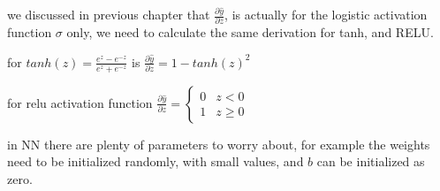 \documentclass[4apaper,12pt]{book}
\begin{document}
\begin{description}
\item we discussed in previous chapter that $\frac{\partial{\hat{y}}}{\partial{z}}$, is actually for the logistic activation function $\sigma$ only, we need to calculate the same derivation for tanh, and RELU.
\item for $tanh(z)=\frac{e^{z}-e^{-z}}{e^{z}+e^{-z}}$ is $\frac{\partial{\hat{y}}}{\partial{z}}=1-tanh(z)^2$
\item for relu activation function $\frac{\partial{\hat{y}}}{\partial{z}}=\begin{cases}0 & z<0\\1 & z\ge0\end{cases}$
\item in NN there are plenty of parameters to worry about, for example the weights need to be initialized randomly, with small values, and $b$ can be initialized as zero.
\end {description}
\end{document}
